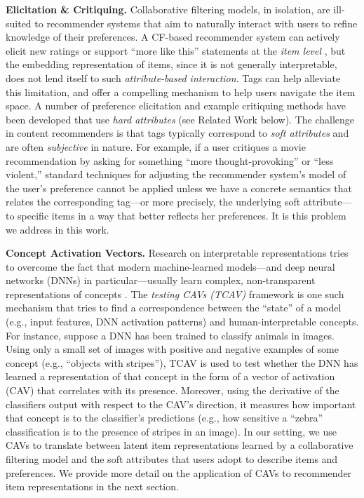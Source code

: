 \documentclass[manuscript,screen,nonacm]{acmart}
\newcommand{\1}{{\mathbf 1}}
\theoremstyle{TheoremNum}
\begin{document}
\vskip 2mm
\noindent
\textbf{Elicitation \& Critiquing.} \hspace*{2mm}
Collaborative filtering models, in isolation, are ill-suited to recommender systems that aim to naturally interact with users to refine knowledge of their preferences. A CF-based recommender system can actively elicit new ratings or support ``more like this'' statements at the \emph{item level} \cite{activecf:uai03,zhao13interactive}, but the embedding representation of items, since it is not generally interpretable, does not lend itself to such \emph{attribute-based interaction}. Tags can help alleviate this limitation, and offer a compelling mechanism to help users navigate the item space.
A number of preference elicitation and example critiquing methods have been developed that use \emph{hard attributes} (see Related Work below). The challenge in content recommenders is that tags typically correspond to \emph{soft attributes} and are often \emph{subjective} in nature. For example, if a user critiques a movie recommendation by asking for something ``more thought-provoking'' or ``less violent,'' standard techniques for adjusting the recommender system's model of the user's preference cannot be applied unless we have a concrete semantics that relates the corresponding tag---or more precisely, the underlying soft attribute---to specific items in a way that better reflects her preferences. It is this problem we address in this work.


\vskip 2mm
\noindent
\textbf{Concept Activation Vectors.} \hspace*{2mm}
Research on interpretable representations tries to overcome the fact that modern machine-learned models---and deep neural networks (DNNs) in particular---usually learn complex, non-transparent representations of concepts \cite{sundararajan:icml2017,kimTCAV:icml18}.
The \emph{testing CAVs (TCAV)} framework
\cite{kimTCAV:icml18} is one such mechanism that tries to find a correspondence between the ``state'' of a model (e.g.,
input features, DNN activation patterns) and human-interpretable concepts. For instance, suppose a DNN has been trained to classify animals in images. Using only a small set of images with positive and negative examples of some concept (e.g., ``objects with stripes''), TCAV is used to test whether the DNN has learned a representation of that concept in the form of a vector of activation (CAV) that correlates with its presence. Moreover, using the derivative of the classifiers output with respect to the CAV's direction, it measures how important that concept is to the classifier's predictions (e.g., how sensitive a ``zebra'' classification is to the presence of stripes in an image). In our setting, we use CAVs to translate between latent item representations learned by a collaborative filtering model and the soft attributes that users adopt to describe items and preferences. We provide more detail on the application of CAVs to recommender item representations in the next section.
\end{document}
